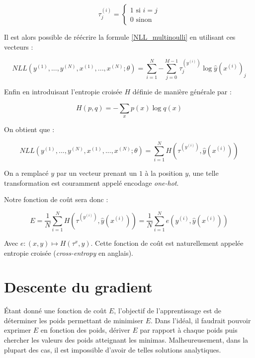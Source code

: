 \documentclass{report}
\begin{document}
$$ \tau^{(i)}_j = 
\left\{
    \begin{array}{ll}
        1 \text{ si } i = j \\
        0 \text{ sinon}
    \end{array}
\right.
$$

Il est alors possible de réécrire la formule \ref{NLL_multinoulli} en utilisant ces vecteurs :

\begin{equation}
NLL(y^{(1)}, ..., y^{(N)}, x^{(1)}, ..., x^{(N)}; \theta) = \sum_{i=1}^{N}{-\sum_{j=0}^{M-1}{\tau^{(y^{(i)})}_j\log \hat{y}(x^{(i)})_j}}
\end{equation}

Enfin en introduisant l'entropie croisée $H$ définie de manière générale par :

$$
H(p, q) = -\sum_{x}{p(x)\log q(x)}
$$

On obtient que :

\begin{equation}
NLL(y^{(1)}, ..., y^{(N)}, x^{(1)}, ..., x^{(N)}; \theta) = \sum_{i=1}^{N}{H(\tau^{(y^{(i)})}, \hat{y}(x^{(i)}))}
\end{equation}

On a remplacé $y$ par un vecteur prenant un $1$ à la position $y$, une telle transformation est couramment appelé encodage \textit{one-hot}. 

Notre fonction de coût sera donc :

\begin{equation}
E = \frac{1}{N}\sum_{i=1}^{N}{H(\tau^{(y^{(i)})}, \hat{y}(x^{(i)}))} = \frac{1}{N}\sum_{i=1}^{N}{e(y^{(i)}, \hat{y}(x^{(i)}))}
\end{equation}

Avec $e : (x, y) \mapsto H(\tau^x, y)$. Cette fonction de coût est naturellement appelée entropie croisée (\textit{cross-entropy} en anglais).

\section{Descente du gradient}

Étant donné une fonction de coût $E$, l'objectif de l'apprentissage est de déterminer les poids permettant de minimiser $E$. Dans l'idéal, il faudrait pouvoir exprimer $E$ en fonction des poids, dériver $E$ par rapport à chaque poids puis chercher les valeurs des poids atteignant les minimas. Malheureusement, dans la plupart des cas, il est impossible d'avoir de telles solutions analytiques.
\end{document}
